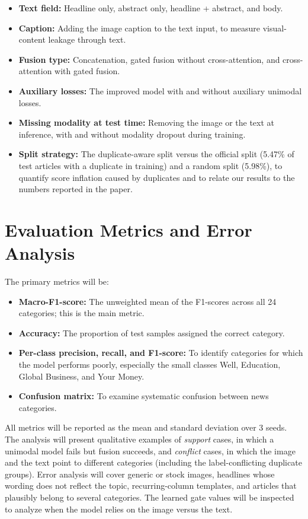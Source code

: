 \documentclass[11pt,a4paper]{article}
\begin{document}
\begin{itemize}
\item \textbf{Text field:} Headline only, abstract only, headline + abstract, and body.
\item \textbf{Caption:} Adding the image caption to the text input, to measure visual-content leakage through text.
\item \textbf{Fusion type:} Concatenation, gated fusion without cross-attention, and cross-attention with gated fusion.
\item \textbf{Auxiliary losses:} The improved model with and without auxiliary unimodal losses.
\item \textbf{Missing modality at test time:} Removing the image or the text at inference, with and without modality dropout during training.
\item \textbf{Split strategy:} The duplicate-aware split versus the official split (5.47\% of test articles with a duplicate in training) and a random split (5.98\%), to quantify score inflation caused by duplicates and to relate our results to the numbers reported in the paper.
\end{itemize}

\section{Evaluation Metrics and Error Analysis}

The primary metrics will be:

\begin{itemize}
\item \textbf{Macro-F1-score:} The unweighted mean of the F1-scores across all 24 categories; this is the main metric.
\item \textbf{Accuracy:} The proportion of test samples assigned the correct category.
\item \textbf{Per-class precision, recall, and F1-score:} To identify categories for which the model performs poorly, especially the small classes Well, Education, Global Business, and Your Money.
\item \textbf{Confusion matrix:} To examine systematic confusion between news categories.
\end{itemize}

All metrics will be reported as the mean and standard deviation over 3 seeds. The analysis will present qualitative examples of \emph{support} cases, in which a unimodal model fails but fusion succeeds, and \emph{conflict} cases, in which the image and the text point to different categories (including the label-conflicting duplicate groups). Error analysis will cover generic or stock images, headlines whose wording does not reflect the topic, recurring-column templates, and articles that plausibly belong to several categories. The learned gate values will be inspected to analyze when the model relies on the image versus the text.
\end{document}
